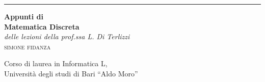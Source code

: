 \begin{titlepage}
    \raggedleft   %

    \rule{1pt}{\textheight}   %
    \hspace{0.05\textwidth}   %
%
    \parbox[b]{0.75\textwidth}{%
        {   %
            \Huge\bfseries%
            Appunti di                                         \\[0.5\baselineskip]%
            Matematica Discreta%
        }                                                      \\[2\baselineskip]%
        {   %
            \Large\textit{%
                delle lezioni della prof.ssa L. Di Terlizzi%
            }%
        }                                                      \\[4\baselineskip]%
        {   %
            \Large\textsc{%
                simone fidanza%
            }%
        }%

        \vspace{0.5\textheight} %
        {   %
            \noindent Corso di laurea in Informatica L,   \\
            Università degli studi di Bari ``Aldo Moro''%
        }                                                      \\[\baselineskip]%
    }
\end{titlepage}

